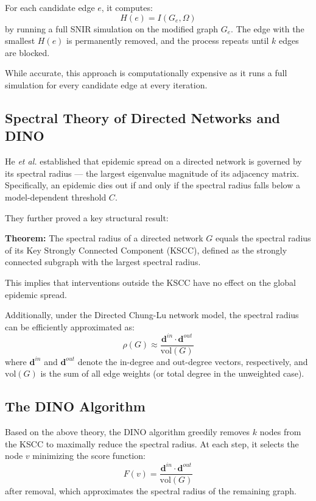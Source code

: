 \documentclass[conference]{IEEEtran}
\begin{document}
For each candidate edge $e$, it computes:
\begin{equation}
H(e) = I(G_e, \Omega)
\end{equation}
by running a full SNIR simulation on the modified graph $G_e$. The edge with the smallest $H(e)$ is permanently removed, and the process repeats until $k$ edges are blocked.

While accurate, this approach is computationally expensive as it runs a full simulation for every candidate edge at every iteration.

\subsection{Spectral Theory of Directed Networks and DINO}

He \textit{et al.} established that epidemic spread on a directed network is governed by its spectral radius --- the largest eigenvalue magnitude of its adjacency matrix. Specifically, an epidemic dies out if and only if the spectral radius falls below a model-dependent threshold $C$.

They further proved a key structural result:

\textbf{Theorem:} The spectral radius of a directed network $G$ equals the spectral radius of its Key Strongly Connected Component (KSCC), defined as the strongly connected subgraph with the largest spectral radius.

This implies that interventions outside the KSCC have no effect on the global epidemic spread.

Additionally, under the Directed Chung-Lu network model, the spectral radius can be efficiently approximated as:
\begin{equation}
\rho(G) \approx \frac{\mathbf{d}^{in} \cdot \mathbf{d}^{out}}{\mathrm{vol}(G)}
\end{equation}
where $\mathbf{d}^{in}$ and $\mathbf{d}^{out}$ denote the in-degree and out-degree vectors, respectively, and $\mathrm{vol}(G)$ is the sum of all edge weights (or total degree in the unweighted case).

\subsection{The DINO Algorithm}

Based on the above theory, the DINO algorithm greedily removes $k$ nodes from the KSCC to maximally reduce the spectral radius. At each step, it selects the node $v$ minimizing the score function:
\begin{equation}
F(v) = \frac{\mathbf{d}^{in} \cdot \mathbf{d}^{out}}{\mathrm{vol}(G)}
\end{equation}
after removal, which approximates the spectral radius of the remaining graph.
\end{document}
